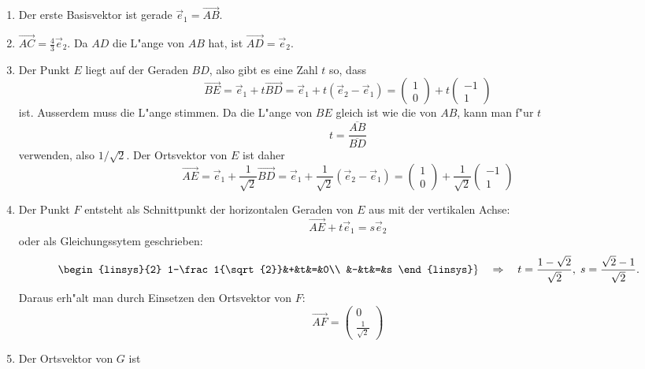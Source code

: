 \begin{loesung}
\begin{teilaufgaben}
\item
\renewcommand{\labelenumii}{\arabic{enumii}.}
\begin{enumerate}
\item Der erste Basisvektor ist gerade $\vec{e}_1=\overrightarrow{AB}$.
\item $\overrightarrow{AC}=\frac43 \vec{e}_2$.
Da $AD$ die L"ange von $AB$ hat, ist $\overrightarrow{AD}=\vec{e}_2$.
\item Der Punkt $E$ liegt auf der Geraden $BD$, also gibt es eine
Zahl  $t$ so, dass
\[
\overrightarrow{BE}
=
\vec{e}_1+t\overrightarrow{BD}
=
\vec{e}_1+t(\vec{e}_2-\vec{e}_1)
=
\begin{pmatrix}1\\0\end{pmatrix}+t\begin{pmatrix}-1\\1\end{pmatrix}
\]
ist.
Ausserdem muss die L"ange stimmen.
Da die L"ange von $BE$ gleich ist wie die von $AB$, kann man f"ur $t$
\[
t=\frac{\overline{AB}}{\overline{BD}}
\]
verwenden, also $1/\sqrt{2}$.
Der Ortsvektor von $E$ ist daher
\[
\overrightarrow{AE}
=
\vec{e}_1+\frac1{\sqrt{2}}\overrightarrow{BD}
=
\vec{e}_1+\frac1{\sqrt{2}}(\vec{e}_2-\vec{e}_1)
=
\begin{pmatrix}1\\0\end{pmatrix}+\frac1{\sqrt{2}}\begin{pmatrix}-1\\1\end{pmatrix}
\]
\item Der Punkt $F$ entsteht als Schnittpunkt der horizontalen Geraden von
$E$ aus mit der vertikalen Achse:
\[
\overrightarrow{AE}+t\vec{e}_1 = s\vec{e}_2
\]
oder als Gleichungssytem geschrieben:
\[
\left.
\begin{linsys}{2}
1-\frac1{\sqrt{2}}&+&t&=&0\\
                  &-&t&=&s
\end{linsys}
\right\}
\quad\Rightarrow\quad
t=\frac{1-\sqrt{2}}{\sqrt{2}},
\;
s=\frac{\sqrt{2}-1}{\sqrt{2}}.
\]
Daraus erh"alt man durch Einsetzen den Ortsvektor von $F$:
\[
\overrightarrow{AF}
=
\begin{pmatrix}
0\\\frac1{\sqrt{2}}
\end{pmatrix}
\]
\item Der Ortsvektor von $G$ ist

\end{enumerate}
\end{teilaufgaben}
\end{loesung}
